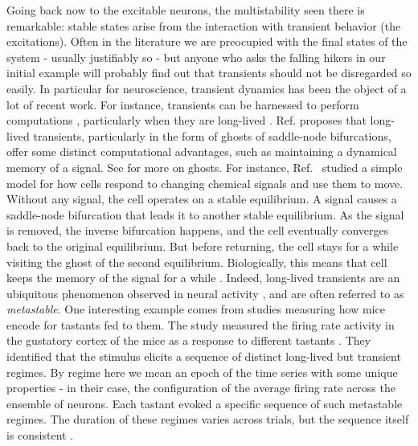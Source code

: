 Going back now to the excitable neurons, the multistability seen there is remarkable: stable states arise from the interaction with transient behavior (the excitations). Often in the literature we are preocupied with the final states of the system - usually justifiably so - but anyone who asks the falling hikers in our initial example will probably find out that transients should not be disregarded so easily. In particular for neuroscience, transient dynamics has been the object of a lot of recent work. For instance, transients can be harnessed to perform computations \cite{budzinski2023an}, particularly when they are long-lived \cite{koch2024biological}. Ref. \cite{koch2024biological} proposes that long-lived transients, particularly in the form of ghosts of saddle-node bifurcations, offer some distinct computational advantages, such as maintaining a dynamical memory of a signal. See  for more on ghosts. For instance, Ref.~\cite{nandan2022cells} studied a simple model for how cells respond to changing chemical signals and use them to move. Without any signal, the cell operates on a stable equilibrium. A signal causes a saddle-node bifurcation that leads it to another stable equilibrium. As the signal is removed, the inverse bifurcation happens, and the cell eventually converges back to the original equilibrium. But before returning, the cell stays for a while visiting the ghost of the second equilibrium. Biologically, this means that cell keeps the memory of the signal for a while \cite{nandan2022cells, koch2024biological}. 
Indeed, long-lived transients are an ubiquitous phenomenon observed in neural activity \cite{tognoli2014metastable, brinkman2022metastable}, and are often referred to as \textit{metastable}. One interesting example comes from studies measuring how mice encode for tastants fed to them. The study measured the firing rate activity in the gustatory cortex of the mice as a response to different tastants \cite{jones2007natural}. They identified that the stimulus elicits a sequence of distinct long-lived but transient regimes. By regime here we mean an epoch of the time series with some unique properties - in their case, the configuration of the average firing rate across the ensemble of neurons. Each tastant evoked a specific sequence of such metastable regimes. The duration of these regimes varies across trials, but the sequence itself is consistent \cite{lacamera2019cortical, brinkman2022metastable}.


